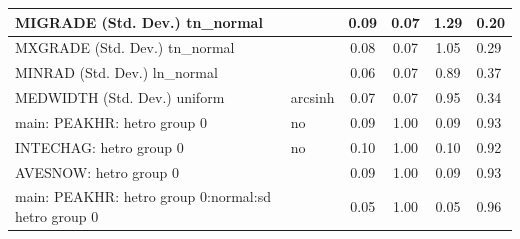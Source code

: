 \begin{table}
\begin{center}
\begin{tabular}{|l|l|c|c|c|l|}
			\hline
			MIGRADE (Std. Dev.) tn_normal &  & 0.09 & 0.07 & 1.29 & 0.20 \\
			\hline
			MXGRADE (Std. Dev.) tn_normal &  & 0.08 & 0.07 & 1.05 & 0.29 \\
			\hline
			MINRAD (Std. Dev.) ln_normal &  & 0.06 & 0.07 & 0.89 & 0.37 \\
			\hline
			MEDWIDTH (Std. Dev.) uniform & arcsinh & 0.07 & 0.07 & 0.95 & 0.34 \\
			\hline
			main: PEAKHR: hetro group 0 & no & 0.09 & 1.00 & 0.09 & 0.93 \\
			\hline
			INTECHAG: hetro group 0 & no & 0.10 & 1.00 & 0.10 & 0.92 \\
			\hline
			AVESNOW: hetro group 0 &  & 0.09 & 1.00 & 0.09 & 0.93 \\
			\hline
			main: PEAKHR: hetro group 0:normal:sd  hetro group 0 &  & 0.05 & 1.00 & 0.05 & 0.96 \\
			\hline
		\end{tabular}
	\end{center}
\end{table}
